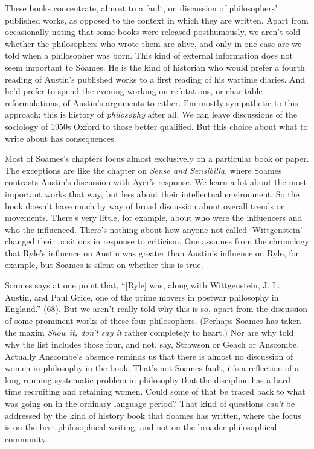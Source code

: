 \documentclass[
  10pt,
  letterpaper,
  DIV=11,
  numbers=noendperiod,
  twoside]{scrartcl}
\begin{document}
These books concentrate, almost to a fault, on discussion of
philosophers' published works, as opposed to the context in which they
are written. Apart from occasionally noting that some books were
released posthumously, we aren't told whether the philosophers who wrote
them are alive, and only in one case are we told when a philosopher was
born. This kind of external information does not seem important to
Soames. He is the kind of historian who would prefer a fourth reading of
Austin's published works to a first reading of his wartime diaries. And
he'd prefer to spend the evening working on refutations, or charitable
reformulations, of Austin's arguments to either. I'm mostly sympathetic
to this approach; this is history of \emph{philosophy} after all. We can
leave discussions of the sociology of 1950s Oxford to those better
qualified. But this choice about what to write about has consequences.

Most of Soames's chapters focus almost exclusively on a particular book
or paper. The exceptions are like the chapter on \emph{Sense and
Sensibilia}, where Soames contrasts Austin's discussion with Ayer's
response. We learn a lot about the most important works that way, but
less about their intellectual environment. So the book doesn't have much
by way of broad discussion about overall trends or movements. There's
very little, for example, about who were the influencers and who the
influenced. There's nothing about how anyone not called `Wittgenstein'
changed their positions in response to criticism. One assumes from the
chronology that Ryle's influence on Austin was greater than Austin's
influence on Ryle, for example, but Soames is silent on whether this is
true.

Soames says at one point that, ``{[}Ryle{]} was, along with
Wittgenstein, J. L. Austin, and Paul Grice, one of the prime movers in
postwar philosophy in England.'' (68). But we aren't really told why
this is so, apart from the discussion of some prominent works of these
four philosophers. (Perhaps Soames has taken the maxim \emph{Show it,
don't say it} rather completely to heart.) Nor are why told why the list
includes those four, and not, say, Strawson or Geach or Anscombe.
Actually Anscombe's absence reminds us that there is almost no
discussion of women in philosophy in the book. That's not Soames fault,
it's a reflection of a long-running systematic problem in philosophy
that the discipline has a hard time recruiting and retaining women.
Could some of that be traced back to what was going on in the ordinary
language period? That kind of questions \emph{can't} be addressed by the
kind of history book that Soames has written, where the focus is on the
best philosophical writing, and not on the broader philosophical
community.
\end{document}
